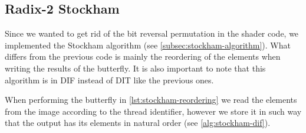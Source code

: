 \documentclass[
  oneside,
  11pt, a4paper,
  footinclude=true,
  headinclude=true,
  cleardoublepage=empty
]{scrbook}
\begin{document}


\subsection{Radix-2 Stockham} \label{subsec:radix2-stockham}

Since we wanted to get rid of the bit reversal permutation in the shader code, we implemented the Stockham algorithm (see \autoref{subsec:stockham-algorithm}). What differs from the previous code is mainly the reordering of the elements when writing the results of the butterfly. It is also important to note that this algorithm is in DIF instead of DIT like the previous ones.
\newline


When performing the butterfly in \autoref{lst:stockham-reordering}  we read the elements from the image according to the thread identifier, however we store it in such way that the output has its elements in natural order (see \autoref{alg:stockham-dif}).
\end{document}
